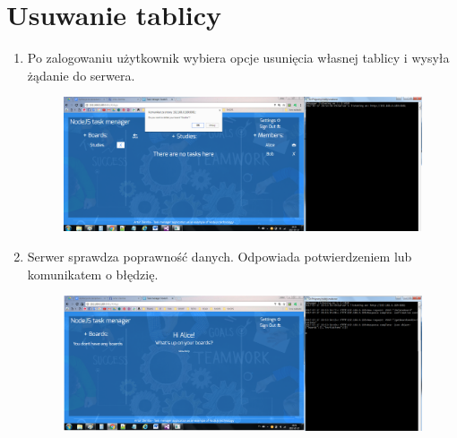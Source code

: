 \documentclass[12pt]{report}
\begin{document}
\section{Usuwanie tablicy}
\begin{enumerate}
\item Po zalogowaniu użytkownik wybiera opcje usunięcia własnej tablicy i wysyła żądanie do serwera.
\begin{figure}[!hb]
\centering
\includegraphics[width=\textwidth,height=\textheight,keepaspectratio]{E1.png}
\end{figure}
\item Serwer sprawdza poprawność danych. Odpowiada potwierdzeniem lub komunikatem o błędzię.
\begin{figure}[!hb]
\centering
\includegraphics[width=\textwidth,height=\textheight,keepaspectratio]{E2.png}
\end{figure}
\end{enumerate}
\end{document}
